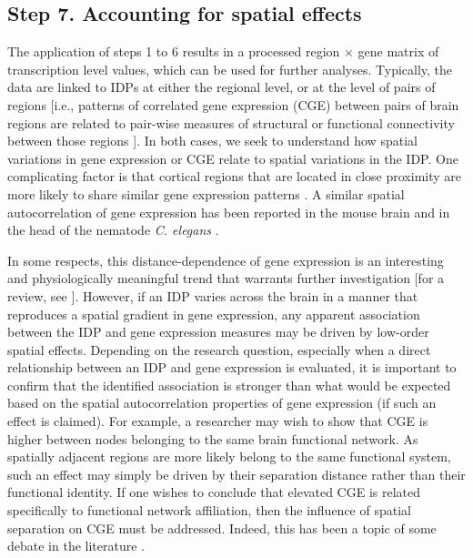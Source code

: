 \documentclass[10pt,A4]{article}
\begin{document}
\subsection*{Step 7. Accounting for spatial effects}

The application of steps 1 to 6 results in a processed region $\times$ gene matrix of transcription level values, which can be used for further analyses. Typically, the data are linked to IDPs at either the regional level, or at the level of pairs of regions [i.e., patterns of correlated gene expression (CGE) between pairs of brain regions are related to pair-wise measures of structural or functional connectivity between those regions \citep{Fornito2018}]. In both cases, we seek to understand how spatial variations in gene expression or CGE relate to spatial variations in the IDP. One complicating factor is that cortical regions that are located in close proximity are more likely to share similar gene expression patterns \citep{Richiardi2015,Krienen2016,Vertes2016b,Pantazatos2017,Richiardi2017}. A similar spatial autocorrelation of gene expression has been reported in the mouse brain \citep{Fulcher2016} and in the head of the nematode \textit{C. elegans} \citep{Arnatkeviciute2018}.

In some respects, this distance-dependence of gene expression is an interesting and physiologically meaningful trend that warrants further investigation [for a review, see \citep{Fornito2018}]. However, if an IDP varies across the brain in a manner that reproduces a spatial gradient in gene expression, any apparent association between the IDP and gene expression measures may be driven by low-order spatial effects. Depending on the research question, especially when a direct relationship between an IDP and gene expression is evaluated, it is important to confirm that the identified association is stronger than what would be expected based on the spatial autocorrelation properties of gene expression (if such an effect is claimed). For example, a researcher may wish to show that CGE is higher between nodes belonging to the same brain functional network. As spatially adjacent regions are more likely belong to the same functional system, such an effect may simply be driven by their separation distance rather than their functional identity. If one wishes to conclude that elevated CGE is related specifically to functional network affiliation, then the influence of spatial separation on CGE must be addressed. Indeed, this has been a topic of some debate in the literature \citep{Richiardi2015,Pantazatos2017,Richiardi2017}.
\end{document}
